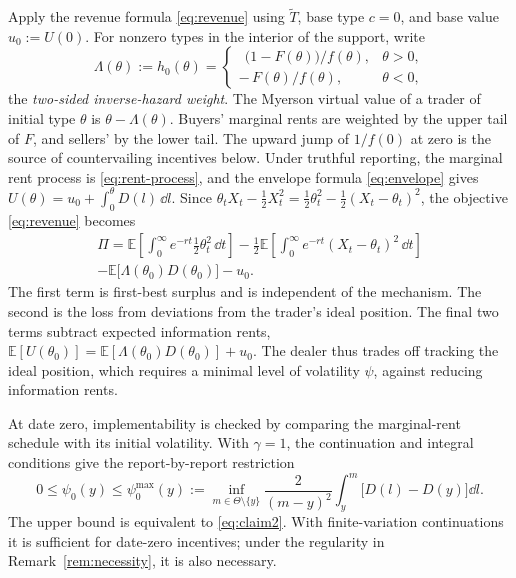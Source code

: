 \documentclass[12pt]{article}
\newcommand{\E}{\mathbb{E}}
\begin{document}
Apply the revenue formula \eqref{eq:revenue} using \(\widetilde T\),
base type \(c=0\), and base value \(u_0:=U(0)\). For nonzero types in
the interior of the support, write
\[
  \Lambda(\theta)
  :=
  h_0(\theta)
  =
  \begin{cases}
    \ \ \bigl(1-F(\theta)\bigr)/f(\theta), & \theta>0,\\[2pt]
    -\,F(\theta)/f(\theta), & \theta<0,
\end{cases}
\]
the \emph{two-sided inverse-hazard weight}. The Myerson virtual value of a trader of initial type $\theta$ is $\theta - \Lambda(\theta)$. Buyers' marginal rents
are weighted by the upper tail of \(F\), and sellers' by the lower tail.
The upward jump of \(1/f(0)\) at zero is the source of countervailing
incentives below. Under truthful reporting, the marginal rent
process is \eqref{eq:rent-process}, and the envelope formula
\eqref{eq:envelope} gives
\(U(\theta)=u_0+\int_0^\theta D(l)\,\dd l\).
Since
\(\theta_tX_t-\frac12X_t^2=\frac12\theta_t^2-\frac12(X_t-\theta_t)^2\),
the objective \eqref{eq:revenue} becomes
\begin{multline}\label{eq:app-tracking-revenue}
  \Pi
  =
  \E\left[\int_0^\infty e^{-rt}\frac12\theta_t^2\,\dd t\right]
  -\frac12\E\left[\int_0^\infty
    e^{-rt}(X_t-\theta_t)^2\,\dd t\right]
  \\-\E\bigl[\Lambda(\theta_0)D(\theta_0)\bigr]
  -u_0.
\end{multline}
The first term is first-best surplus and is independent of the mechanism.
The second is the loss from deviations from the trader's ideal
position. The final two terms subtract expected information rents,
\(\mathbb{E}\left[U(\theta_0)\right]=\E[\Lambda(\theta_0)D(\theta_0)]+u_0\). The
dealer thus trades off tracking the ideal position, which requires a minimal level of volatility $\psi$, against reducing
information rents.

At date zero, implementability is checked by comparing the
marginal-rent schedule with its initial volatility. With \(\gamma=1\),
the continuation and integral conditions give the report-by-report
restriction
\begin{equation}\label{eq:app-datezero}
  0\leq\psi_0(y)
  \leq
  \psi_0^{\max}(y)
  :=
  \inf_{m\in\Theta\setminus\{y\}}
  \frac{2}{(m-y)^2}
  \int_{y}^{m}
  \bigl[D(l)-D(y)\bigr]\dd l .
\end{equation}
The upper bound is equivalent to \eqref{eq:claim2}. With
finite-variation continuations it is sufficient for date-zero
incentives; under the regularity in Remark~\ref{rem:necessity}, it is
also necessary.
\end{document}
